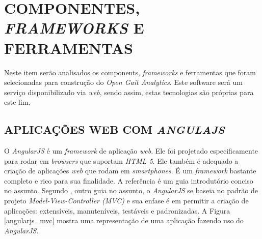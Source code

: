 \section[COMPONENTES, FRAMEWORKS E FERRAMENTAS]{COMPONENTES, \emph{FRAMEWORKS} E FERRAMENTAS}
Neste item serão analisados os components, \emph{frameworks} e ferramentas que foram selecionadas para construção do \emph{Open Gait Analytics}. 
Este software será um serviço disponibilizado via \emph{web}, sendo assim, estas tecnologias são próprias para este fim. 

\subsection{APLICAÇÕES WEB COM \emph{ANGULAJS}}
\label{angularjs}
O \emph{AngularJS} é um \emph{framework} de aplicação \emph{web}. 
Ele foi projetado especificamente para rodar em \emph{browsers} que suportam \emph{HTML 5}.
Ele também é adequado a criação de aplicações \emph{web} que rodam em \emph{smartphones}. 
É um \emph{framework} bastante completo e rico para sua finalidade. 
A referência  é um guia introdutório conciso no assunto.
 Segundo , outro guia no assunto, o \emph{AngularJS} se baseia no padrão de projeto \emph{Model-View-Controller (MVC)} e sua enfase é em permitir a criação de aplicações: extensíveis, manuteníveis, testáveis e padronizadas. 
A Figura \ref{angularjs_mvc} mostra uma representação de uma aplicação fazendo uso do \emph{AngularJS}.

